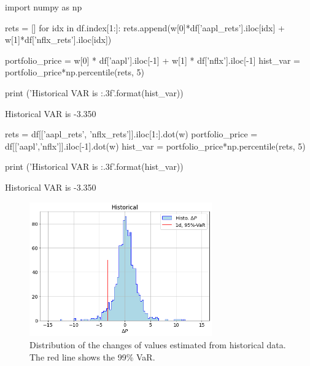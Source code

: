 \begin{ipython}
import numpy as np

rets = []
for idx in df.index[1:]:
rets.append(w[0]*df['aapl_rets'].iloc[idx] + w[1]*df['nflx_rets'].iloc[idx])

portfolio_price = w[0] * df['aapl'].iloc[-1] + w[1] * df['nflx'].iloc[-1]
hist_var = portfolio_price*np.percentile(rets, 5)

print ('Historical VAR is {:.3f}'.format(hist_var))
\end{ipython}
\begin{ioutput}
Historical VAR is -3.350
\end{ioutput}

\begin{ipython}
rets = df[['aapl_rets', 'nflx_rets']].iloc[1:].dot(w)
portfolio_price = df[['aapl','nflx']].iloc[-1].dot(w)
hist_var = portfolio_price*np.percentile(rets, 5)
	
print ('Historical VAR is {:.3f}'.format(hist_var))
\end{ipython}
\begin{ioutput}
Historical VAR is -3.350
\end{ioutput}

\begin{figure}[htb]
\centering
\includegraphics[width=0.7\textwidth]{figures/historical_var}
\caption{Distribution of the changes of values estimated from historical data. The red line shows the 99\% VaR.}
\label{fig:hist_var}
\end{figure}

